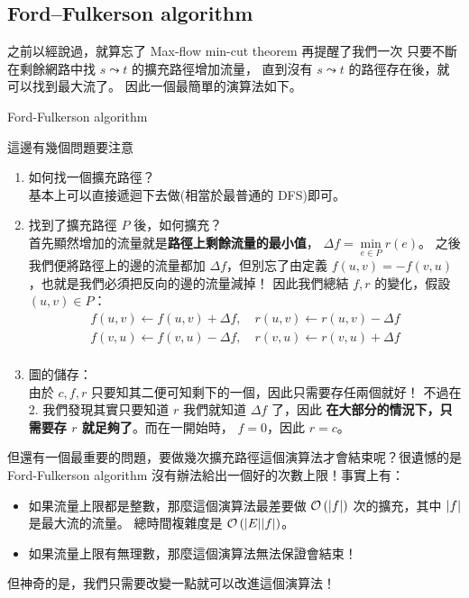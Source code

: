 \documentclass[a4paper,12pt]{book}
\begin{document}
\subsection{Ford–Fulkerson algorithm}
之前以經說過，就算忘了 Max-flow min-cut theorem 再提醒了我們一次
只要不斷在剩餘網路中找 $s \leadsto t$ 的擴充路徑增加流量，
直到沒有 $s \leadsto t$ 的路徑存在後，就可以找到最大流了。
因此一個最簡單的演算法如下。

\begin{algorithm}[H]
  \DontPrintSemicolon
  \caption{Ford-Fulkerson algorithm}\label{euclid}
  \myalg{\FF{}} {
}
\end{algorithm}
這邊有幾個問題要注意
\begin{enumerate}
  \item 如何找一個擴充路徑？\\
    基本上可以直接遞迴下去做(相當於最普通的 DFS)即可。
  \item 找到了擴充路徑 $P$ 後，如何擴充？\\
    首先顯然增加的流量就是{\bf 路徑上剩餘流量的最小值}， 
    $\Delta f = \min\limits_{e \in P} r(e)$。
    之後我們便將路徑上的邊的流量都加 $\Delta f$，但別忘了由定義
    $f(u, v) = -f(v, u)$，也就是我們必須把反向的邊的流量減掉！
    因此我們總結 $f, r$ 的變化，假設 $(u, v) \in P$：
    \begin{align*}
    f(u, v) \gets f(u, v) + \Delta f, \quad r(u, v) \gets r(u, v) - \Delta f \\
    f(v, u) \gets f(v, u) - \Delta f, \quad r(v, u) \gets r(v, u) + \Delta f \\
    \end{align*}
  \item 圖的儲存：\\
    由於 $c, f, r$ 只要知其二便可知剩下的一個，因此只需要存任兩個就好！
    不過在 2. 我們發現其實只要知道 $r$ 我們就知道 $\Delta f$ 了，因此
    {\bf 在大部分的情況下，只需要存 $r$ 就足夠了}。而在一開始時，
    $f = 0$，因此 $r = c$。
\end{enumerate}
但還有一個最重要的問題，要做幾次擴充路徑這個演算法才會結束呢？很遺憾的是
Ford-Fulkerson algorithm 沒有辦法給出一個好的次數上限！事實上有：
\begin{itemize}
  \item 如果流量上限都是整數，那麼這個演算法最差要做 
    $\operatorname{\mathcal{O}}\left(\lvert f \rvert\right)$ 次的擴充，其中 $\lvert f \rvert$ 是最大流的流量。
    總時間複雜度是 $\operatorname{\mathcal{O}}\left(\lvert E \rvert\lvert f \rvert\right)$。
  \item 如果流量上限有無理數，那麼這個演算法無法保證會結束！
\end{itemize}
但神奇的是，我們只需要改變一點就可以改進這個演算法！
\end{document}
